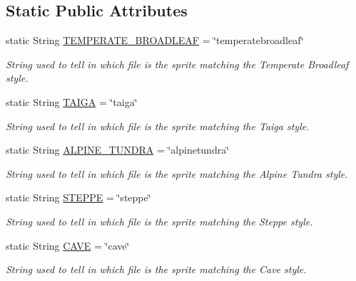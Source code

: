 \subsection*{Static Public Attributes}
\begin{DoxyCompactItemize}
\item 
static String \hyperlink{interfaceworld_1_1scenery_1_1_temperate_broadleaf_theme_a9e9253b684231327dd6ddeca5768033e}{T\-E\-M\-P\-E\-R\-A\-T\-E\-\_\-\-B\-R\-O\-A\-D\-L\-E\-A\-F} = \char`\"{}temperatebroadleaf\char`\"{}
\begin{DoxyCompactList}\small\item\em String used to tell in which file is the sprite matching the Temperate Broadleaf style. \end{DoxyCompactList}\item 
static String \hyperlink{interfaceworld_1_1scenery_1_1_taiga_theme_ad3418d8f4936efb0ef1e3eb2009a34f0}{T\-A\-I\-G\-A} = \char`\"{}taiga\char`\"{}
\begin{DoxyCompactList}\small\item\em String used to tell in which file is the sprite matching the Taiga style. \end{DoxyCompactList}\item 
static String \hyperlink{interfaceworld_1_1scenery_1_1_alpine_tundra_theme_ad3c9b18e312ff348661fc1a42f28f7b6}{A\-L\-P\-I\-N\-E\-\_\-\-T\-U\-N\-D\-R\-A} = \char`\"{}alpinetundra\char`\"{}
\begin{DoxyCompactList}\small\item\em String used to tell in which file is the sprite matching the Alpine Tundra style. \end{DoxyCompactList}\item 
static String \hyperlink{interfaceworld_1_1scenery_1_1_steppe_theme_a03bdfdc54a3a5d52694b77342ec34e3e}{S\-T\-E\-P\-P\-E} = \char`\"{}steppe\char`\"{}
\begin{DoxyCompactList}\small\item\em String used to tell in which file is the sprite matching the Steppe style. \end{DoxyCompactList}\item 
static String \hyperlink{interfaceworld_1_1scenery_1_1_cave_theme_abbad3655c1d1f230dddfd7ecc5194f50}{C\-A\-V\-E} = \char`\"{}cave\char`\"{}
\begin{DoxyCompactList}\small\item\em String used to tell in which file is the sprite matching the Cave style. \end{DoxyCompactList}\item 

\end{DoxyCompactItemize}
